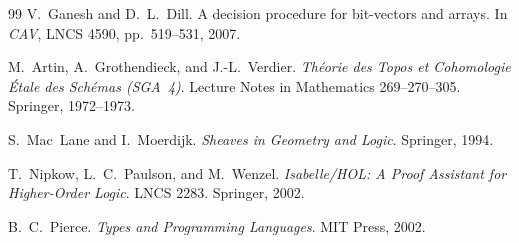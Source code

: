 \documentclass[11pt]{article}
\begin{document}
\begin{thebibliography}{99}
V.~Ganesh and D.~L.~Dill.
\newblock A decision procedure for bit-vectors and arrays.
\newblock In \textit{CAV}, LNCS 4590, pp.~519--531, 2007.

M.~Artin, A.~Grothendieck, and J.-L.~Verdier.
\newblock \textit{Th\'{e}orie des Topos et Cohomologie \'Etale des Sch\'emas
  (SGA~4)}.
\newblock Lecture Notes in Mathematics 269--270--305.
  Springer, 1972--1973.

S.~Mac~Lane and I.~Moerdijk.
\newblock \textit{Sheaves in Geometry and Logic}.
\newblock Springer, 1994.

T.~Nipkow, L.~C.~Paulson, and M.~Wenzel.
\newblock \textit{Isabelle/HOL: A Proof Assistant for Higher-Order Logic}.
\newblock LNCS 2283. Springer, 2002.

B.~C.~Pierce.
\newblock \textit{Types and Programming Languages}.
\newblock MIT Press, 2002.

\end{thebibliography}
\end{document}
